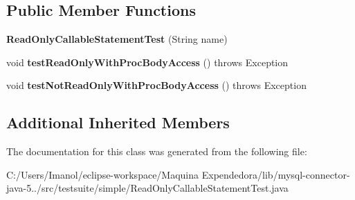 \subsection*{Public Member Functions}
\begin{DoxyCompactItemize}
\item 
\mbox{\label{classtestsuite_1_1simple_1_1_read_only_callable_statement_test_a7328276b96ae1e6ed3a7ac15bcf21839}} 
{\bfseries Read\+Only\+Callable\+Statement\+Test} (String name)
\item 
\mbox{\label{classtestsuite_1_1simple_1_1_read_only_callable_statement_test_a1bfe6cc23301567c3f84a0322a6c1e17}} 
void {\bfseries test\+Read\+Only\+With\+Proc\+Body\+Access} ()  throws Exception 
\item 
\mbox{\label{classtestsuite_1_1simple_1_1_read_only_callable_statement_test_a2966846eec146e9d0a6e8fdbf6cdcc32}} 
void {\bfseries test\+Not\+Read\+Only\+With\+Proc\+Body\+Access} ()  throws Exception 
\end{DoxyCompactItemize}
\subsection*{Additional Inherited Members}


The documentation for this class was generated from the following file\+:\begin{DoxyCompactItemize}
\item 
C\+:/\+Users/\+Imanol/eclipse-\/workspace/\+Maquina Expendedora/lib/mysql-\/connector-\/java-\/5../src/testsuite/simple/Read\+Only\+Callable\+Statement\+Test.\+java\end{DoxyCompactItemize}
